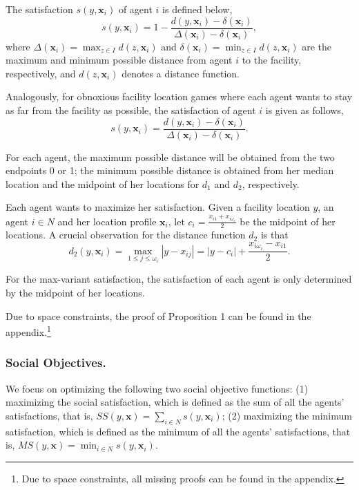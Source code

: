 \documentclass[runningheads]{11llncst}
\begin{document}
The satisfaction  $s(y,\textbf{x}_i)$ of agent $i$ is defined below, $$s(y,\textbf{x}_i)=1-\frac{d(y,\textbf{x}_i)-\delta(\textbf{x}_i)}{\Delta(\textbf{x}_i)-\delta(\textbf{x}_i)},$$
where $\Delta(\textbf{x}_i)=\max_{z\in I}d(z,\textbf{x}_i)$ and  $\delta(\textbf{x}_i)=\min_{z\in I}d(z,\textbf{x}_i)$ are the maximum and minimum possible distance from agent $i$ to the facility, respectively, and $d(z,\textbf{x}_i)$ denotes a distance function.

Analogously, for  obnoxious facility location games where each agent wants to stay as far from the facility as possible, the satisfaction of agent $i$ is given as follows,  $$s(y,\textbf{x}_i)=\frac{d(y,\textbf{x}_i)-\delta(\textbf{x}_i)}{\Delta(\textbf{x}_i)-\delta(\textbf{x}_i)}.$$




For each agent, the maximum possible distance will be obtained from the two endpoints 0 or 1; the minimum possible distance is obtained from her median location and the midpoint of her locations for $d_1$ and $d_2$, respectively.


Each agent wants to maximize her satisfaction. Given a facility location $y$, an  agent $i\in N$ and her location profile $\textbf{x}_i$, let $c_i=\frac{x_{i1}+x_{i\omega_i}}{2}$ be the midpoint of her locations. A crucial observation for the distance function $d_2$ is that  $$d_2(y,\textbf{x}_i)=\max_{1\leq j\leq \omega_i}|y-x_{ij}|=|y-c_i|+\frac{x_{i\omega_i}-x_{i1}}{2}.$$ 
 

\begin{proposition}
    For the  max-variant satisfaction, the satisfaction of each agent  is only determined by  the midpoint of her locations.
\end{proposition}

Due to space constraints, the proof of Proposition 1 can be found in the appendix.\footnote{Due to space constraints, all missing proofs can be found in the appendix.} 


\subsubsection{Social Objectives.} We  focus on optimizing the following two social objective functions: (1) maximizing the social satisfaction, which is defined as the  sum of all the agents' satisfactions, that is, $SS(y,\textbf{x}) =\sum_{i\in N}s(y, \textbf{x}_i)$; (2) maximizing the minimum satisfaction, which is defined as the minimum of all the agents' satisfactions, that is, $MS(y,\textbf{x}) =\min_{i\in N}s(y, \textbf{x}_i)$. 
\end{document}
